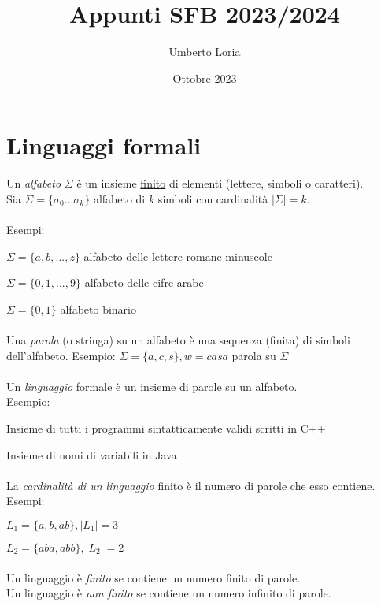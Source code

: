 \documentclass[]{article}
\title{Appunti SFB 2023/2024}
\author{Umberto Loria}
\date{Ottobre 2023}
\begin{document}
\begin{titlepage}
\maketitle
\end{titlepage}

\tableofcontents{}
\newpage
\section{Linguaggi formali}

Un \textit{alfabeto} \mbox{$\Sigma$} è un insieme \underline{finito} di elementi (lettere, simboli o caratteri).
\\
Sia \mbox{$\Sigma=\{\sigma_0 ... \sigma_k\}$} alfabeto di \begin{math}k\end{math} simboli con cardinalità \mbox{$|\Sigma|=k$}.
\\
\\
Esempi:

\mbox{$\Sigma=\{a, b, ..., z\}$} alfabeto delle lettere romane minuscole

\mbox{$\Sigma=\{0, 1, ..., 9\}$} alfabeto delle cifre arabe

\mbox{$\Sigma=\{0, 1\}$} alfabeto binario
\\
\\
Una \textit{parola} (o stringa) su un alfabeto è una sequenza (finita) di simboli dell'alfabeto.
Esempio: \mbox{$\Sigma = \{a, c, s\}, w = casa$} parola su \mbox{$\Sigma$}
\\
\\
Un \textit{linguaggio} formale è un insieme di parole su un alfabeto.
\\
Esempio:

Insieme di tutti i programmi sintatticamente validi scritti in C++

Insieme di nomi di variabili in Java
\\
\\
La \textit{cardinalità di un linguaggio} finito è il numero di parole che esso contiene.
Esempi:

\mbox{$L_1=\{a, b, ab\}, |L_1|=3$}

\mbox{$L_2=\{aba, abb\}, |L_2|=2$}
\\
\\
Un linguaggio è \textit{finito} se contiene un numero finito di parole.
\\
Un linguaggio è \textit{non finito} se contiene un numero infinito di parole.
\end{document}
